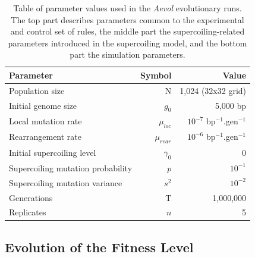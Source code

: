 \begin{table}[h]
  \begin{center}
    \begin{tabular}{ l r r }
    \toprule
    \textbf{Parameter} & \textbf{Symbol} & \textbf{Value}\\
    \midrule
    Population size & N & 1,024 (32x32 grid) \\
    Initial genome size & $g_0$ & 5,000 bp \\
    Local mutation rate & $\mu_{loc}$ & $10^{-7}$ bp$^{-1}$.gen$^{-1}$ \\
    Rearrangement rate & $\mu_{rear}$ &$10^{-6}$ bp$^{-1}$.gen$^{-1}$ \\
    \midrule
    Initial supercoiling level & $\gamma_0$ & 0 \\
    Supercoiling mutation probability & $p$ & $10^{-1}$ \\
    Supercoiling mutation variance & $s^2$ & $10^{-2}$ \\
    \midrule
    Generations & T & 1,000,000 \\
    Replicates & $n$ & 5\\
    \bottomrule
    \end{tabular}
    \end{center}
  \caption[Table of parameter values for the \emph{Aevol} runs]{Table of parameter values used in the \emph{Aevol} evolutionary runs.
  The top part describes parameters common to the experimental and control set of rules, the middle part the supercoiling-related parameters introduced in the supercoiling model, and the bottom part the simulation parameters.}
  \label{tab:aevol:param_values}
\end{table}

\subsection{Evolution of the Fitness Level}

